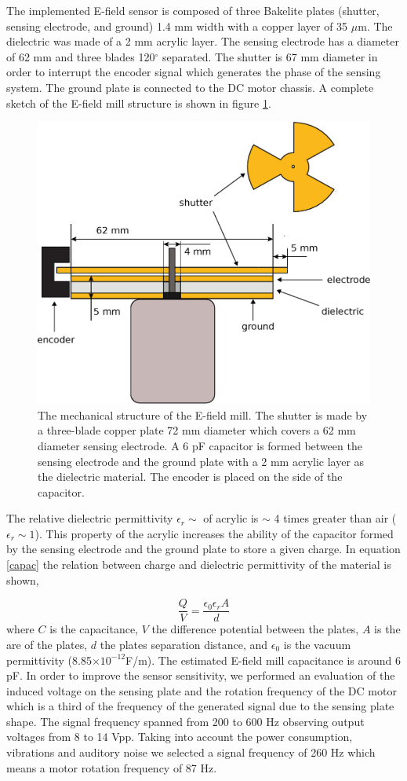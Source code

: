 \documentclass[a4paper]{jpconf}
\begin{document}
The implemented E-field sensor is composed of three Bakelite plates (shutter, sensing electrode, and ground) 1.4 mm width with a copper layer of 35 $\mu$m. The dielectric was made of a 2 mm acrylic layer. The sensing electrode has a diameter of 62 mm and three blades 120$^{\circ}$ separated. The shutter is 67 mm diameter in order to interrupt the encoder signal which generates the phase of the sensing system. The ground plate is connected to the DC motor chassis. A complete sketch of the E-field mill structure is shown in figure \ref{emill}.

\begin{figure}[h]
\includegraphics[width=.5\textwidth]{Figures/Emill.eps}\hspace{2pc}
\begin{minipage}[b]{14pc}\caption{\label{emill} The mechanical structure of the E-field mill. The shutter is made by a three-blade copper plate 72 mm diameter which covers a 62 mm diameter sensing electrode. A 6 pF capacitor is formed between the sensing electrode and the ground plate with a 2 mm acrylic layer as the dielectric material. The encoder is placed on the side of the capacitor.}
\end{minipage}
\end{figure}
The relative dielectric permittivity $\epsilon_r \sim$ of acrylic is $\sim$ 4 times greater than air ($\epsilon_r \sim 1 $). This property of the acrylic increases the ability of the capacitor formed by the sensing electrode and the ground plate to store a given charge. In equation \ref{capac} the relation between charge and dielectric permittivity of the material is shown,

\begin{equation}
    \frac{Q}{V}=\frac{\epsilon_0 \epsilon_r A}{d}
    \label{capac}
\end{equation}
where $C$ is the capacitance, $V$ the difference potential between the plates, $A$ is the are of the plates, $d$ the plates separation distance, and $\epsilon_0$ is the vacuum permittivity (8.85$\times10^{-12}$F/m). The estimated E-field mill capacitance is around 6 pF.
In order to improve the sensor sensitivity, we performed an evaluation of the induced voltage on the sensing plate and the rotation frequency of the DC motor which is a third of the frequency of the generated signal due to the sensing plate shape. The signal frequency spanned from 200 to 600 Hz observing output voltages from 8 to 14 Vpp. Taking into account the power consumption, vibrations and auditory noise we selected a signal frequency of 260 Hz which means a motor rotation frequency of 87 Hz. 
\end{document}
